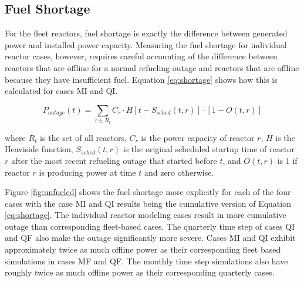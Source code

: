 \documentclass{style}
\begin{document}
\subsection{Fuel Shortage}

For the fleet reactors, fuel shortage is exactly the
difference between generated power and installed power capacity. Measuring the
fuel shortage for individual reactor cases, however, requires careful
accounting of the difference between reactors that are offline for a normal
refueling outage and reactors that are offline because they have insufficient
fuel. Equation \ref{eq:shortage} shows how this is calculated for cases MI and
QI.

\begin{equation}
    P_{outage}(t) = \sum\limits_{r \in R_t} C_r \cdot H[t-S_{sched}(t,r)] \cdot [1-O(t,r)]
    \label{eq:shortage}
\end{equation}

where $R_t$ is the set of all reactors, $C_r$ is the power capacity of reactor
$r$, $H$ is the Heaviside function, $S_{sched}(t,r)$ is the original scheduled
startup time of reactor $r$ after the most recent refueling outage that
started before $t$, and $O(t,r)$ is 1 if reactor $r$ is producing power at
time $t$ and zero otherwise.

Figure \ref{fig:unfueled} shows the fuel shortage more explicitly for each of
the four cases with the case MI and QI results being the cumulative version of
Equation \ref{eq:shortage}.  The individual reactor modeling cases result in
more cumulative outage than corresponding fleet-based cases. The quarterly
time step of cases QI and QF also make the outage significantly more severe.
Cases MI and QI exhibit approximately twice as much offline power as their
corresponding fleet based simulations in cases MF and QF.  The monthly time
step simulations also have roughly twice as much offline power as their
corresponding quarterly cases.
\end{document}
